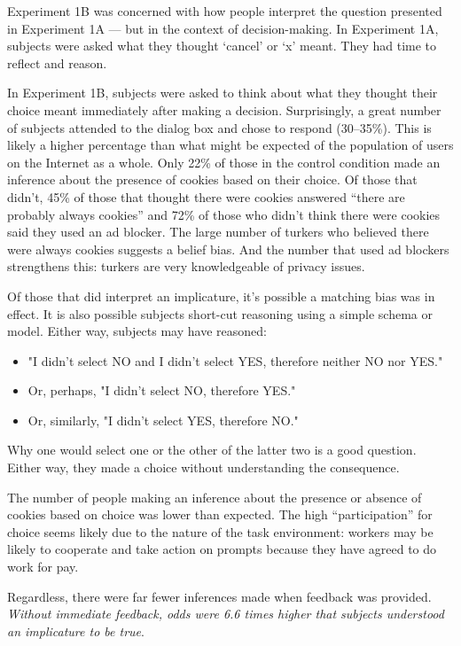 Experiment 1B was concerned with how people interpret the question presented in Experiment 1A --- but in the context of decision-making. In Experiment 1A, subjects were asked what they thought `cancel' or `x' meant. They had time to reflect and reason. 

In Experiment 1B, subjects were asked to think about what they thought their choice meant immediately after making a decision. Surprisingly, a great number of subjects attended to the dialog box and chose to respond (30--35\%). This is likely a higher percentage than what might be expected of the population of users on the Internet as a whole. Only 22\% of those in the control condition made an inference about the presence of cookies based on their choice. Of those that didn't, 45\% of those that thought there were cookies answered ``there are probably always cookies'' and 72\% of those who didn't think there were cookies said they used an ad blocker. The large number of turkers who believed there were always cookies suggests a belief bias. And the number that used ad blockers strengthens this: turkers are very knowledgeable of privacy issues.

Of those that did interpret an implicature, it's possible a matching bias was in effect. It is also possible subjects short-cut reasoning using a simple schema or model. Either way, subjects may have reasoned:

\begin{itemize}
\item "I didn't select NO and I didn't select YES, therefore neither NO nor YES." 
\item Or, perhaps, "I didn't select NO, therefore YES." 
\item Or, similarly, "I didn't select YES, therefore NO."
\end{itemize}

Why one would select one or the other of the latter two is a good question. Either way, they made a choice without understanding the consequence.

The number of people making an inference about the presence or absence of cookies based on choice was lower than expected. The high ``participation'' for choice seems likely due to the nature of the task environment: workers may be likely to cooperate and take action on prompts because they have agreed to do work for pay. 

Regardless, there were far fewer inferences made when feedback was provided. \emph{Without immediate feedback, odds were 6.6 times higher that subjects understood an implicature to be true}.

